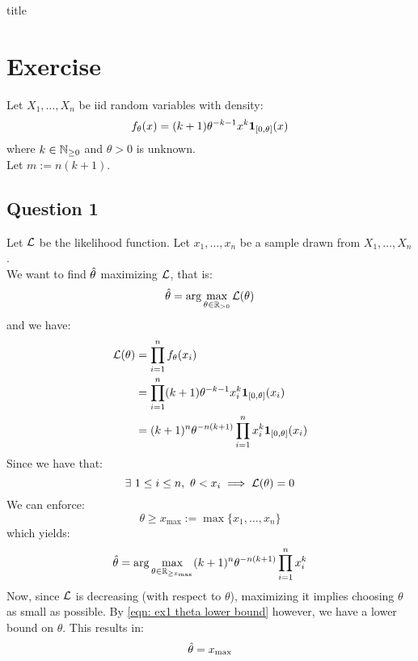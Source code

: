 \documentclass[12pt]{article}
\begin{document}
{title}

\tableofcontents


\section{Exercise}
Let \(X_1, \ldots, X_n\) be \gls{iid} random variables with density:
\begin{equation}
    \label{eqn: ex1 pdf}
    f_{\theta}(x) = (k+1) \theta^{-k-1} x^k \mathbf{1}_{[0, \theta]} (x)
\end{equation}
where \(k \in \mathbb{N}_{\geq 0}\) and \(\theta > 0\) is unknown. \\
Let \(m := n(k+1)\).

\subsection{Question 1}
Let \(\mathcal{L}\) be the likelihood function. Let \(x_1, \ldots, x_n\) be a sample drawn from \(X_1, \ldots, X_n\). \\
We want to find \(\hat{\theta}\) maximizing \(\mathcal{L}\), that is:
\begin{equation}
    \hat{\theta} = \arg \max_{\theta \in \mathbb{R}_{>0}} \mathcal{L}(\theta)                                                          \\
\end{equation}
and we have:
\begin{align*}
    \mathcal{L}(\theta)
     & = \prod_{i=1}^n f_\theta (x_i)                                        \\
     & = \prod_{i=1}^n (k+1) \theta^{-k-1} x_i^k \mathbf{1}_{[0, \theta]} (x_i)      \\
     & = (k+1)^n \theta^{-n(k+1)} \prod_{i=1}^n x_i^k \mathbf{1}_{[0, \theta]} (x_i) \\
\end{align*}
Since we have that:
\begin{equation*}
    \exists\ 1 \leq i \leq n,\ \theta < x_i \implies \mathcal{L}(\theta) = 0
\end{equation*}
We can enforce:
\begin{equation}
    \label{eqn: ex1 theta lower bound}
    \theta \geq x_{\max} := \max \{x_1, \ldots, x_n\}
\end{equation}
which yields:
\begin{equation*}
    \hat{\theta} = \arg \max_{\theta \in \mathbb{R}_{\geq x_{\max}}} (k+1)^n \theta^{-n(k+1)} \prod_{i=1}^n x_i^k
\end{equation*}
Now, since \(\mathcal{L}\) is decreasing (with respect to \(\theta\)), maximizing it implies choosing \(\theta\) as small as possible. By \eqref{eqn: ex1 theta lower bound} however, we have a lower bound on \(\theta\). This results in:
\begin{equation*}
    \hat{\theta} = x_{\max}
\end{equation*}
\end{document}
